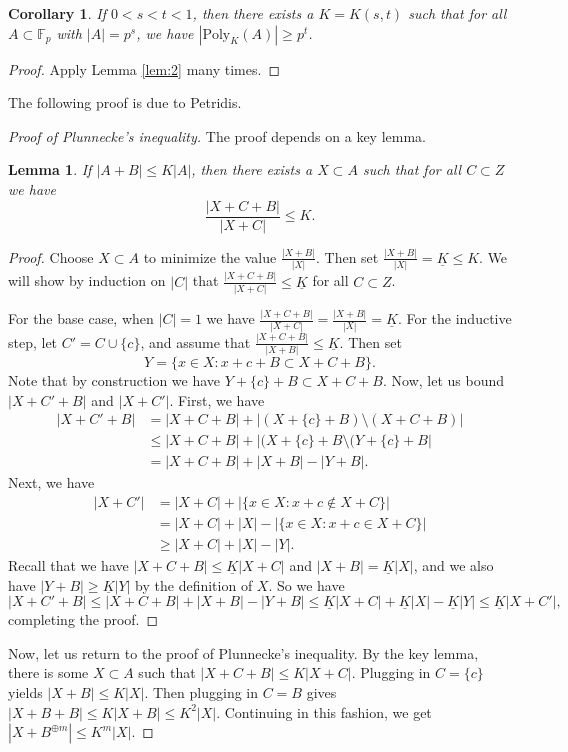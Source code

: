 \documentclass[12pt]{amsart}
\newtheorem{lemma}[theorem]{Lemma}
\newtheorem{corollary}[theorem]{Corollary}
\newcommand{\F}{\mathbb{F}}
\newcommand{\poly}{\mathrm{Poly}}
\begin{document}
\begin{corollary}
    If $0<s<t<1$, then there exists a $K=K(s,t)$ such that for all $A\subset\F_p$ with $|A|=p^s$, we have $|\poly_K(A)|\geq p^t$.
\end{corollary}
\begin{proof}
    Apply Lemma \ref{lem:2} many times.
\end{proof}

The following proof is due to Petridis.

\begin{proof}[Proof of Plunnecke's inequality]
    The proof depends on a key lemma.

    \begin{lemma}
        If $|A+B|\leq K|A|$, then there exists a $X\subset A$ such that for all $C\subset Z$ we have
        $$\frac{|X+C+B|}{|X+C|}\leq K.$$
    \end{lemma}
    \begin{proof}
        Choose $X\subset A$ to minimize the value $\frac{|X+B|}{|X|}$. Then set $\frac{|X+B|}{|X|}=\underline{K}\leq K$. We will show by induction on $|C|$ that $\frac{|X+C+B|}{|X+C|}\leq\underline{K}$ for all $C\subset Z$.

        For the base case, when $|C|=1$ we have $\frac{|X+C+B|}{|X+C|}=\frac{|X+B|}{|X|}=\underline{K}$. For the inductive step, let $C'=C\cup\{c\}$, and assume that $\frac{|X+C+B|}{|X+B|}\leq\underline{K}$. Then set
        $$Y=\{x\in X:x+c+B\subset X+C+B\}.$$
        Note that by construction we have $Y+\{c\}+B\subset X+C+B$. Now, let us bound $|X+C'+B|$ and $|X+C'|$. First, we have
        \begin{align*}
            |X+C'+B|&=|X+C+B|+|(X+\{c\}+B)\setminus(X+C+B)|\\
            &\leq|X+C+B|+|(X+\{c\}+B\setminus(Y+\{c\}+B|\\
            &=|X+C+B|+|X+B|-|Y+B|.
        \end{align*}
        Next, we have
        \begin{align*}
            |X+C'|&=|X+C|+|\{x\in X:x+c\not\in X+C\}|\\
            &=|X+C|+|X|-|\{x\in X:x+c\in X+C\}|\\
            &\geq|X+C|+|X|-|Y|.
        \end{align*}
        Recall that we have $|X+C+B|\leq\underline{K}|X+C|$ and $|X+B|=\underline{K}|X|$, and we also have $|Y+B|\geq\underline{K}|Y|$ by the definition of $X$. So we have
        $$|X+C'+B|\leq|X+C+B|+|X+B|-|Y+B|\leq\underline{K}|X+C|+\underline{K}|X|-\underline{K}|Y|\leq\underline{K}|X+C'|,$$
        completing the proof.
    \end{proof}
    Now, let us return to the proof of Plunnecke's inequality. By the key lemma, there is some $X\subset A$ such that $|X+C+B|\leq K|X+C|$. Plugging in $C=\{c\}$ yields $|X+B|\leq K|X|$. Then plugging in $C=B$ gives $|X+B+B|\leq K|X+B|\leq K^2|X|$. Continuing in this fashion, we get $|X+B^{\oplus m}|\leq K^m|X|$.


\end{proof}
\end{document}
